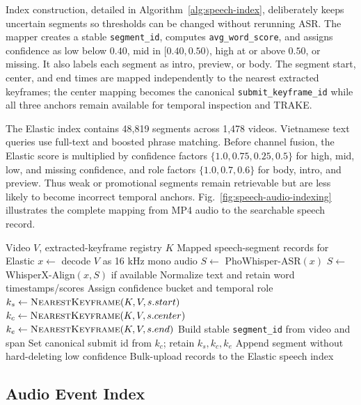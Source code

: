 \documentclass[conference]{IEEEtran}
\newcommand{\sid}{\texttt{submit\_keyframe\_id}}
\newcommand{\field}[1]{\nolinkurl{#1}}
\begin{document}
Index construction, detailed in Algorithm~\ref{alg:speech-index}, deliberately
keeps uncertain segments so thresholds can be changed without rerunning ASR.
The mapper creates a stable \field{segment_id}, computes
\field{avg_word_score}, and assigns confidence as low below $0.40$, mid in
$[0.40,0.50)$, high at or above $0.50$, or missing. It also labels each segment
as intro, preview, or body. The segment start, center, and end times are mapped
independently to the nearest extracted keyframes; the center mapping becomes the
canonical \sid{} while all three anchors remain available for temporal
inspection and TRAKE.

The Elastic index contains 48,819 segments across 1,478 videos. Vietnamese text
queries use full-text and boosted phrase matching. Before channel fusion, the
Elastic score is multiplied by confidence factors
$\{1.0,0.75,0.25,0.5\}$ for high, mid, low, and missing confidence, and role
factors $\{1.0,0.7,0.6\}$ for body, intro, and preview. Thus weak or promotional
segments remain retrievable but are less likely to become incorrect temporal
anchors. Fig.~\ref{fig:speech-audio-indexing} illustrates the complete mapping
from MP4 audio to the searchable speech record.

\begin{algorithm}[!t]
\caption{Speech transcript indexing}
\label{alg:speech-index}
\footnotesize
\begin{algorithmic}[1]
\Require Video $V$, extracted-keyframe registry $K$
\Ensure Mapped speech-segment records for Elastic
\State $x \gets$ decode $V$ as 16 kHz mono audio
\State $S \gets$ PhoWhisper-ASR$(x)$
\State $S \gets$ WhisperX-Align$(x,S)$ if available
  \State Normalize text and retain word timestamps/scores
  \State Assign confidence bucket and temporal role
  \State $k_s \gets \Call{NearestKeyframe}{K,V,s.start}$
  \State $k_c \gets \Call{NearestKeyframe}{K,V,s.center}$
  \State $k_e \gets \Call{NearestKeyframe}{K,V,s.end}$
  \State Build stable \texttt{segment\_id} from video and span
  \State Set canonical submit id from $k_c$; retain $k_s,k_c,k_e$
  \State Append segment without hard-deleting low confidence
\EndFor
\State Bulk-upload records to the Elastic speech index
\end{algorithmic}
\end{algorithm}

\subsection{Audio Event Index}
\end{document}
